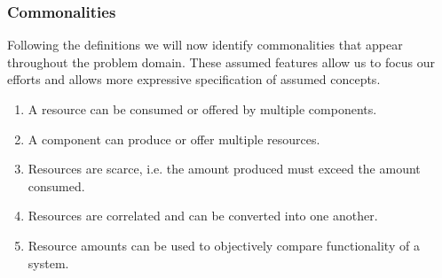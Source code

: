 \subsubsection{Commonalities}
Following the definitions we will now identify commonalities that appear throughout the problem domain. These assumed features allow us to focus our efforts and allows more expressive specification of assumed concepts.
\begin{enumerate}[label=C\rdmid .\arabic*]
\nospace
\item \label{c:1resource_multiplex} A resource can be consumed or offered by multiple components.
\item \label{c:2component_multiplex} A component can produce or offer multiple resources.
\item \label{c:3scarce} Resources are scarce, i.e. the amount produced must exceed the amount consumed.
\item \label{c:4res_transf} Resources are correlated and can be converted into one another.
\item \label{c:5optimize} Resource amounts can be used to objectively compare functionality of a system.
\end{enumerate}

